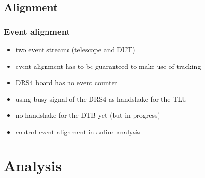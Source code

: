 \documentclass[9pt]{beamer}
\begin{document}
\subsection{Alignment}
\begin{frame}
	\frametitle{Event alignment}
	\begin{itemize}
		\setlength{\itemsep}{\fill}
		\item two event streams (telescope and DUT)
		\item event alignment has to be guaranteed to make use of tracking
		\item DRS4 board has no event counter
		\item using busy signal of the DRS4 as handshake for the TLU
		\item no handshake for the DTB yet (but in progress)
		\item control event alignment in online analysis
	\end{itemize}
\end{frame}
\section{Analysis}
\end{document}
